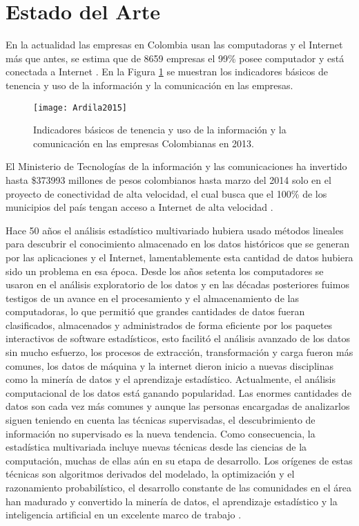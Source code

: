 \chapter*{Estado del Arte}

En la actualidad las empresas en Colombia usan las computadoras y el Internet más que antes, se estima que de 8659 empresas el 99\% posee computador y está conectada a Internet \cite{Ardila2015}. En la Figura \ref{Ardila2015} se muestran los indicadores básicos de tenencia y uso de la información y la comunicación en las empresas. 
\begin{figure}[ht]
\centering
\texttt{[image: Ardila2015]}
\caption{Indicadores básicos de tenencia y uso de la información y la comunicación en las empresas Colombianas en 2013.}
\label{Ardila2015}
\end{figure}
	
El Ministerio de Tecnologías de la información y las comunicaciones ha invertido hasta \$373993 millones de pesos colombianos hasta marzo del 2014 solo en el proyecto de conectividad de alta velocidad, el cual busca que el 100\% de los municipios del país tengan acceso a Internet de alta velocidad \cite{Comunicaciones2014}. 

Hace 50 años el análisis estadístico multivariado hubiera usado métodos lineales para descubrir el conocimiento almacenado en los datos históricos que se generan por las aplicaciones y el Internet, lamentablemente esta cantidad de datos hubiera sido un problema en esa época. Desde los años setenta los computadores se usaron en el análisis exploratorio de los datos y en las décadas posteriores fuimos testigos de un avance en el procesamiento y el almacenamiento de las computadoras, lo que permitió que grandes cantidades de datos fueran clasificados, almacenados y administrados de forma eficiente por los paquetes interactivos de software estadísticos, esto facilitó el análisis avanzado de los datos sin mucho esfuerzo, los procesos de extracción, transformación y carga fueron más comunes, los datos de máquina y la internet dieron inicio a nuevas disciplinas como la minería de datos y el aprendizaje estadístico. Actualmente, el análisis computacional de los datos está ganando popularidad. Las enormes cantidades de datos son cada vez más comunes y aunque las personas encargadas de analizarlos siguen teniendo en cuenta las técnicas supervisadas,  el descubrimiento de información no supervisado es la nueva tendencia. Como consecuencia, la estadística multivariada incluye nuevas técnicas desde las ciencias de la computación, muchas de ellas aún en su etapa de desarrollo. Los orígenes de estas técnicas son algoritmos derivados del modelado, la optimización y el razonamiento probabilístico, el desarrollo constante de las comunidades en el área han madurado y convertido la minería de datos, el aprendizaje estadístico y la inteligencia artificial en un excelente marco de trabajo \cite{Hastie2009}.


